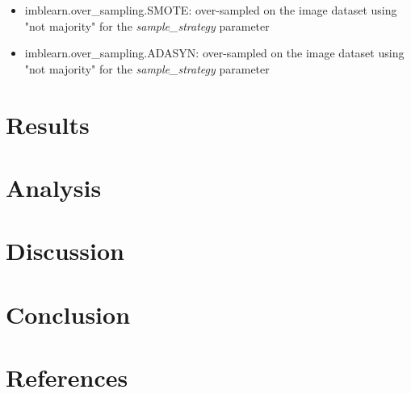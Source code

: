\documentclass{article}
\begin{document}
\begin{itemize}
	\item imblearn.over\_sampling.SMOTE: over-sampled on the image dataset using "not majority" for the \textit{sample\_strategy} parameter
	
	\item imblearn.over\_sampling.ADASYN: over-sampled on the image dataset using "not majority" for the \textit{sample\_strategy} parameter
	
\end{itemize}



\section{Results}

\section{Analysis}

\section{Discussion}

\section{Conclusion	}

\section{References	}
\end{document}
